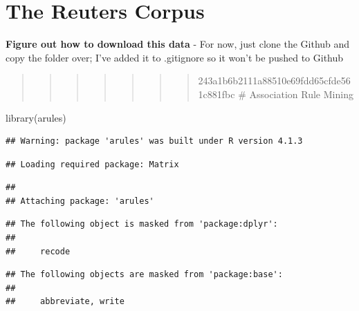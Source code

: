 \documentclass[
]{article}
\newenvironment{Shaded}{\begin{snugshade}}{\end{snugshade}}
\newcommand{\FunctionTok}[1]{\textcolor[rgb]{0.00,0.00,0.00}{#1}}
\newcommand{\NormalTok}[1]{#1}
\begin{document}
\hypertarget{the-reuters-corpus}{%
\section{The Reuters Corpus}\label{the-reuters-corpus}}

\textbf{Figure out how to download this data} - For now, just clone the
Github and copy the folder over; I've added it to .gitignore so it won't
be pushed to Github

\begin{quote}
\begin{quote}
\begin{quote}
\begin{quote}
\begin{quote}
\begin{quote}
\begin{quote}
243a1b6b2111a88510e69fdd65cfde561c881fbc \# Association Rule Mining
\end{quote}
\end{quote}
\end{quote}
\end{quote}
\end{quote}
\end{quote}
\end{quote}

\begin{Shaded}
\begin{Highlighting}[]
\FunctionTok{library}\NormalTok{(arules)}
\end{Highlighting}
\end{Shaded}

\begin{verbatim}
## Warning: package 'arules' was built under R version 4.1.3
\end{verbatim}

\begin{verbatim}
## Loading required package: Matrix
\end{verbatim}

\begin{verbatim}
## 
## Attaching package: 'arules'
\end{verbatim}

\begin{verbatim}
## The following object is masked from 'package:dplyr':
## 
##     recode
\end{verbatim}

\begin{verbatim}
## The following objects are masked from 'package:base':
## 
##     abbreviate, write
\end{verbatim}
\end{document}
